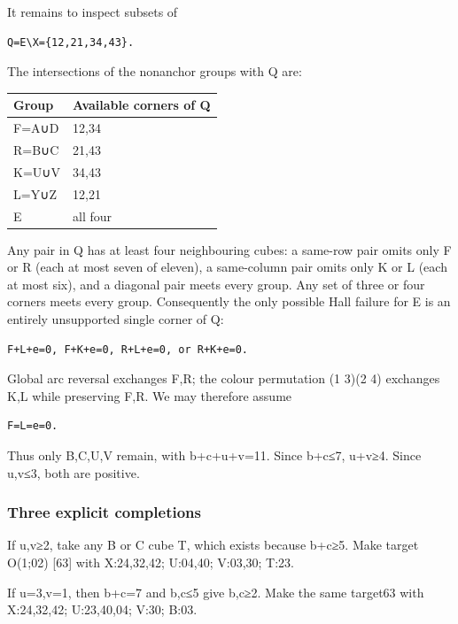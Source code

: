 \documentclass[
  10pt,
]{article}
\begin{document}
It remains to inspect subsets of

\begin{verbatim}
Q=E\X={12,21,34,43}.
\end{verbatim}

The intersections of the nonanchor groups with Q are:

\begin{longtable}[]{@{}ll@{}}
\toprule\noalign{}
Group & Available corners of Q \\
\midrule\noalign{}
\endhead
\bottomrule\noalign{}
\endlastfoot
F=A∪D & 12,34 \\
R=B∪C & 21,43 \\
K=U∪V & 34,43 \\
L=Y∪Z & 12,21 \\
E & all four \\
\end{longtable}

Any pair in Q has at least four neighbouring cubes: a same-row pair
omits only F or R (each at most seven of eleven), a same-column pair
omits only K or L (each at most six), and a diagonal pair meets every
group. Any set of three or four corners meets every group. Consequently
the only possible Hall failure for E is an entirely unsupported single
corner of Q:

\begin{verbatim}
F+L+e=0, F+K+e=0, R+L+e=0, or R+K+e=0.
\end{verbatim}

Global arc reversal exchanges F,R; the colour permutation (1 3)(2 4)
exchanges K,L while preserving F,R. We may therefore assume

\begin{verbatim}
F=L=e=0.
\end{verbatim}

Thus only B,C,U,V remain, with b+c+u+v=11. Since b+c≤7, u+v≥4. Since
u,v≤3, both are positive.

\hypertarget{three-explicit-completions}{%
\subsubsection*{Three explicit
completions}\label{three-explicit-completions}}

If u,v≥2, take any B or C cube T, which exists because b+c≥5. Make
target O(1;02) {[}63{]} with X:24,32,42; U:04,40; V:03,30;
T:23.

If u=3,v=1, then b+c=7 and b,c≤5 give b,c≥2. Make the same target63 with
X:24,32,42; U:23,40,04; V:30; B:03.
\end{document}
